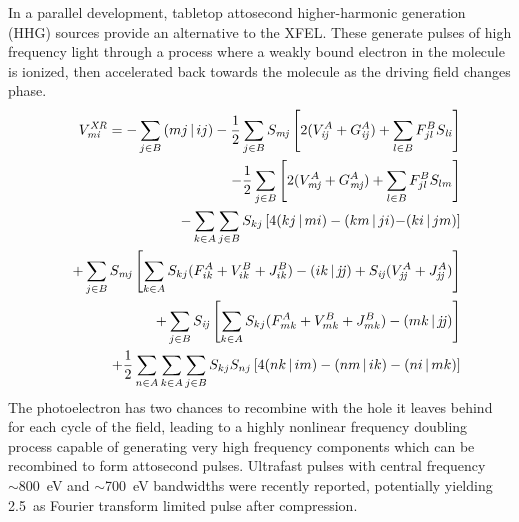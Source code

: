 \documentclass{ar-1col}
\begin{document}
In a parallel development, tabletop attosecond higher-harmonic
generation (HHG)
\cite{kapteyn_harnessing_2007,krausz_attosecond_2009,worner_attosecond_2011,hentschel_attosecond_2001,popmintchev_attosecond_2010}
sources provide an alternative to the XFEL. These generate pulses of
high frequency light through a process where a weakly bound electron
in the molecule is ionized, then accelerated back towards the molecule
as the driving field changes phase.
\begin{eqnarray}
&&\hspace*{-30pt}V_{\it mi}^{\it XR}  =  - \sum_{j \in B} {( {mj} \,{\mid}\, {ij} )}  - \frac{1}{2}\sum_{j \in B} {S_{\it mj} \left[ {2( {V_{\it ij}^A  + G_{\it ij}^A } ) + \sum_{l \in B} {F_{jl}^B S_{\it li} } } \right]}  \nonumber\\
&&- \frac{1}{2}\sum_{j \in B} {\left[ {2( {V_{\it mj}^A  + G_{\it mj}^A } ) + \sum_{l \in B} {F_{jl}^B S_{lm} } } \right]} \nonumber \\
&&- \sum_{k \in A} {\sum_{j \in B} {S_{kj} \left[ {4( {kj\,{\mid}\, {mi} ) - ( {km\,{\mid}\, {ji} ) - } ( {ki\,{\mid}\, {jm} )} } } \right]} } \nonumber \\
&&+ \sum_{j \in B} {S_{\it mj} \left[ {\sum_{k \in A} {S_{kj} ( {F_{ik}^A  + V_{ik}^B  + {J}_{ik}^B } ) - ( {ik\,{\mid}\, {\it jj} ) + S_{\it ij} ( {V_{\it jj}^A  + {J}_{\it jj}^A } )} } } \right]} \nonumber \\
&&+ \sum_{j \in B} {S_{\it ij} } \left[ {\sum_{k \in A} {S_{kj} ( {F_{mk}^A  + V_{mk}^B  + {J}_{mk}^B } ) - ( {mk\,{\mid}\, {\it jj} )} } } \right]\nonumber \\
&&+ \frac{1}{2}\sum_{n \in A} {\sum_{k \in A} {\sum_{j \in B} {S_{kj} S_{nj} \left[ {4 ( {nk\,{\mid}\, im} ) - ( {nm\,{\mid}\, ik} ) - ( {ni\,{\mid}\, mk} )} \right]} } }%
\end{eqnarray}
The photoelectron has two chances to recombine with the hole it leaves
behind for each cycle of the field, leading to a highly nonlinear
frequency doubling process capable of generating very high frequency
components which can be recombined to form attosecond pulses.
Ultrafast pulses with central frequency $\sim 800$~eV and $\sim$700~eV
bandwidths were recently reported, potentially yielding 2.5~as Fourier
transform limited pulse after
compression.\cite{popmintchev_bright_2012,bourzac_tabletop_2012} %
\end{document}
